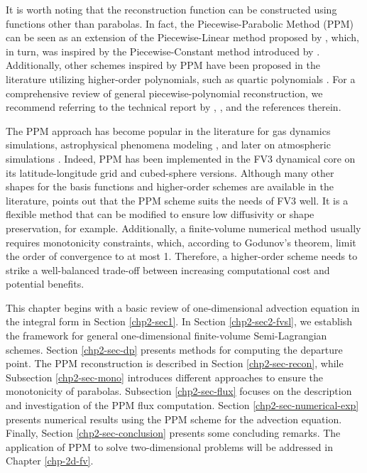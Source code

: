 It is worth noting that the reconstruction function can be constructed using functions other than parabolas.
 In fact, the Piecewise-Parabolic Method (PPM) can be seen as an
extension of the Piecewise-Linear method proposed by \citet{vanleer:1977}, which,
in turn, was inspired by the Piecewise-Constant method introduced by \citet{godunov:1959}. 
Additionally, other schemes inspired by PPM have been proposed in the literature utilizing
higher-order polynomials, such as quartic polynomials \citep{white:2008}. For a
comprehensive review of general piecewise-polynomial reconstruction, we recommend
referring to the technical report by \citet{engwirda:2016}, \citet{lauritzen:2011}, and the
references therein.

The PPM approach has become popular in the literature for gas dynamics simulations, astrophysical 
phenomena modeling \citep{woodward:1986}, and later on atmospheric simulations \citep{carpenter:1990}. 
Indeed, PPM has been implemented in the FV3 dynamical core on its latitude-longitude grid \citep{lin:2004}
and cubed-sphere \citep{putman:2007} versions.
Although many other shapes for the basis functions and higher-order schemes are available in the literature, 
\citet{harris:2021} points out that the PPM scheme suits the needs of FV3 well. It is a flexible method that
can be modified to ensure low diffusivity or shape preservation, for example.
Additionally, a finite-volume numerical method usually requires monotonicity constraints, which, according 
to Godunov's theorem, limit the order of convergence to at most 1. 
Therefore, a higher-order scheme needs to strike a well-balanced trade-off between increasing computational 
cost and potential benefits.

This chapter begins with a basic review of one-dimensional advection equation in the integral form
in Section \ref{chp2-sec1}. In Section \ref{chp2-sec2-fvsl}, we establish the framework for general
one-dimensional finite-volume Semi-Lagrangian schemes. Section \ref{chp2-sec-dp} presents
methods for computing the departure point. The PPM reconstruction is described in Section \ref{chp2-sec-recon},
while Subsection \ref{chp2-sec-mono} introduces different approaches to ensure the monotonicity of parabolas.
Subsection \ref{chp2-sec-flux} focuses on the description and investigation of the PPM flux computation.
Section \ref{chp2-sec-numerical-exp}
presents numerical results using the PPM scheme for the advection equation.
Finally, Section \ref{chp2-sec-conclusion} presents some concluding remarks.
The application of PPM to solve two-dimensional problems will be addressed in Chapter \ref{chp-2d-fv}.

